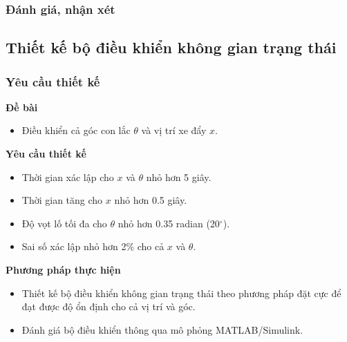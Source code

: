\documentclass[12pt,a4paper]{article}
\begin{document}
\subsubsection{Đánh giá, nhận xét}

\newpage
\subsection{Thiết kế bộ điều khiển không gian trạng thái}
\subsubsection{Yêu cầu thiết kế}
\begin{minipage}[t]{0.3\linewidth}
    \textbf{Đề bài}
\end{minipage}\begin{minipage}[t]{0.6\linewidth}
    \begin{itemize}
        \item Điều khiển cả góc con lắc $\theta$ và vị trí xe đẩy $x$.
    \end{itemize}
\end{minipage}

\vspace{\baselineskip}

\begin{minipage}[t]{0.3\linewidth}
    \textbf{Yêu cầu thiết kế}
\end{minipage}\begin{minipage}[t]{0.6\linewidth}
    \begin{itemize}[noitemsep,topsep=0pt]
        \item Thời gian xác lập cho $x$ và $\theta$ nhỏ hơn 5 giây.
        \item Thời gian tăng cho $x$ nhỏ hơn 0.5 giây. 
        \item Độ vọt lố tối đa cho $\theta$ nhỏ hơn 0.35 radian (20$^\circ$). 
        \item Sai số xác lập nhỏ hơn 2\% cho cả $x$ và $\theta$. 
    \end{itemize}
\end{minipage}

\vspace{\baselineskip}

\begin{minipage}[t]{0.3\linewidth}
    \textbf{Phương pháp thực hiện}
\end{minipage}\begin{minipage}[t]{0.6\linewidth}
    \begin{itemize}[noitemsep,topsep=0pt]
        \item Thiết kế bộ điều khiển không gian trạng thái theo phương pháp đặt cực để đạt được độ ổn định cho cả vị trí và góc. 
        \item Đánh giá bộ điều khiển thông qua mô phỏng MATLAB/Simulink. 
    \end{itemize}
\end{minipage}
\end{document}
